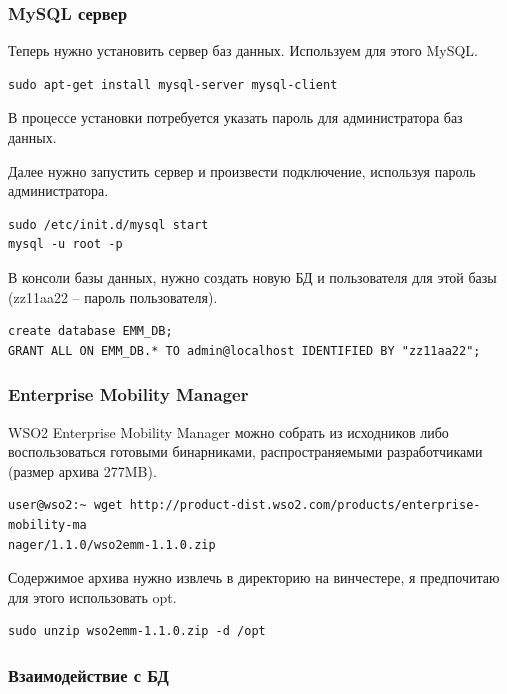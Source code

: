 \documentclass[a4paper, 12pt]{article}		%
\begin{document}
\subsubsection{MySQL сервер}

Теперь нужно установить сервер баз данных. Используем для этого MySQL.

\begin{Verbatim}[frame=single]
sudo apt-get install mysql-server mysql-client
\end{Verbatim}

В процессе установки потребуется указать пароль для администратора баз данных.

Далее нужно запустить сервер и произвести подключение, используя пароль администратора.

\begin{Verbatim}[frame=single]
sudo /etc/init.d/mysql start 
mysql -u root -p
\end{Verbatim}

В консоли базы данных, нужно создать новую БД и пользователя для этой базы (zz11aa22 -- пароль пользователя).

\begin{Verbatim}[frame=single]
create database EMM_DB;
GRANT ALL ON EMM_DB.* TO admin@localhost IDENTIFIED BY "zz11aa22";
\end{Verbatim}

\subsubsection{Enterprise Mobility Manager}

WSO2 Enterprise Mobility Manager можно собрать из исходников либо воспользоваться готовыми бинарниками, распространяемыми разработчиками (размер архива 277MB).

\begin{Verbatim}[frame=single]
user@wso2:~ wget http://product-dist.wso2.com/products/enterprise-mobility-ma
nager/1.1.0/wso2emm-1.1.0.zip
\end{Verbatim}

Содержимое архива нужно извлечь в директорию на винчестере, я предпочитаю для этого использовать opt.

\begin{Verbatim}[frame=single]
sudo unzip wso2emm-1.1.0.zip -d /opt
\end{Verbatim}

\subsubsection{Взаимодействие с БД}
\end{document}
